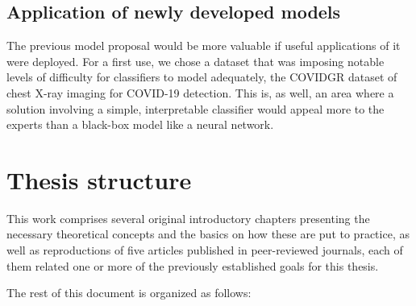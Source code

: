 
\subsection{Application of newly developed models}

The previous model proposal would be more valuable if useful applications of it were deployed. For a first use, we chose a dataset that was imposing notable levels of difficulty for classifiers to model adequately, the COVIDGR dataset of chest X-ray imaging for COVID-19 detection. This is, as well, an area where a solution involving a simple, interpretable classifier would appeal more to the experts than a black-box model like a neural network.


\section{Thesis structure}

This work comprises several original introductory chapters presenting the necessary theoretical concepts and the basics on how these are put to practice, as well as reproductions of five articles published in peer-reviewed journals, each of them related one or more of the previously established goals for this thesis.

The rest of this document is organized as follows: %

